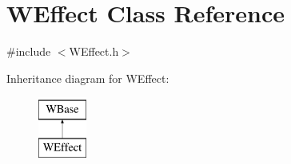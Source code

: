 \hypertarget{class_w_effect}{}\section{W\+Effect Class Reference}
\label{class_w_effect}


{\ttfamily \#include $<$W\+Effect.\+h$>$}

Inheritance diagram for W\+Effect\+:\begin{figure}[H]
\begin{center}
\leavevmode
\includegraphics[height=2.000000cm]{class_w_effect}
\end{center}
\end{figure}
